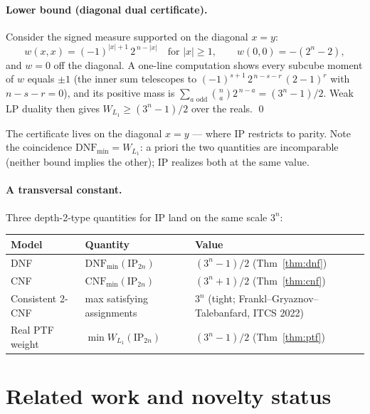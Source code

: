 \documentclass[11pt]{article}
\newcommand{\IP}{\mathrm{IP}}
\newcommand{\DNFmin}{\mathrm{DNF}_{\min}}
\newcommand{\CNFmin}{\mathrm{CNF}_{\min}}
\newcommand{\WL}{W_{L_1}}
\begin{document}
\paragraph{Lower bound (diagonal dual certificate).}
Consider the signed measure supported on the diagonal $x = y$:
\[
w(x, x) = (-1)^{\lvert x\rvert + 1}\, 2^{\,n - \lvert x\rvert}
\quad \text{for } \lvert x\rvert \ge 1,
\qquad w(0, 0) = -(2^n - 2),
\]
and $w = 0$ off the diagonal. A one-line computation shows every
subcube moment of $w$ equals $\pm 1$ (the inner sum telescopes to
$(-1)^{s+1}\, 2^{\,n-s-r}\, (2-1)^r$ with $n - s - r = 0$), and its
positive mass is
$\sum_{a \text{ odd}} \binom{n}{a} 2^{\,n-a} = (3^n-1)/2$. Weak LP
duality then gives $\WL \ge (3^n-1)/2$ over the reals. \qed

\medskip
The certificate lives on the diagonal $x = y$ --- where $\IP$
restricts to parity. Note the coincidence $\DNFmin = \WL$: a priori
the two quantities are incomparable (neither bound implies the
other); $\IP$ realizes both at the same value.

\paragraph{A transversal constant.}
Three depth-2-type quantities for $\IP$ land on the same scale
$3^{n}$:

\begin{center}
\begin{tabular}{lll}
\toprule
Model & Quantity & Value \\
\midrule
DNF & $\DNFmin(\IP_{2n})$ & $(3^n-1)/2$ (Thm~\ref{thm:dnf}) \\
CNF & $\CNFmin(\IP_{2n})$ & $(3^n+1)/2$ (Thm~\ref{thm:cnf}) \\
Consistent 2-CNF & max satisfying assignments & $3^n$ (tight;
  Frankl--Gryaznov--Talebanfard, ITCS 2022) \\
Real PTF weight & $\min \WL(\IP_{2n})$ & $(3^n-1)/2$
  (Thm~\ref{thm:ptf}) \\
\bottomrule
\end{tabular}
\end{center}

\section{Related work and novelty status}\label{sec:related}
\end{document}
